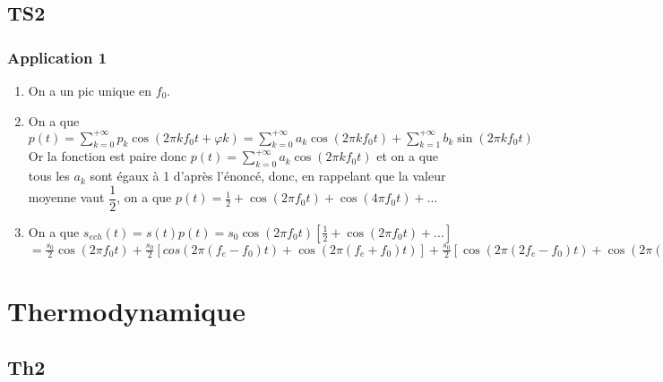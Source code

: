\documentclass[a4paper,12pt]{book}
\begin{document}
\section{TS2}
\subsection{Application 1}
\begin{enumerate}
\item On a un pic unique en $f_0$.
\item On a que $p(t)=\sum\limits_{k=0}^{+\infty}p_k\cos(2\pi kf_0t+\varphi k) = \sum\limits_{k=0}^{+\infty}a_k\cos(2\pi kf_0t) + \sum\limits_{k=1}^{+\infty} b_k\sin(2\pi kf_0t)$ Or la fonction est paire donc $p(t)= \sum\limits_{k=0}^{+\infty}a_k\cos(2\pi kf_0t)$ et on a que tous les $a_k$ sont égaux à 1 d'après l'énoncé, donc, en rappelant que la valeur moyenne vaut $\dfrac{1}{2}$, on a que $p(t)=\frac{1}{2} +\cos(2\pi f_0t) + \cos(4\pi f_0t) +...$
\item On a que $s_{ech}(t) = s(t)p(t) = s_0\cos(2\pi f_0t)\left[\frac{1}{2}+\cos(2\pi f_0t)+...\right]$
\\ $ = \frac{s_0}{2}\cos(2\pi f_0t) + \frac{s_0}{2}[cos(2\pi (f_e-f_0)t)+\cos(2\pi (f_e+f_0)t)] + \frac{s_0}{2}[\cos(2\pi (2f_e-f_0)t)+\cos(2\pi(2f_E+f_0)t)]+...$
\end{enumerate}




















\chapter{Thermodynamique}
\section{Th2}
\end{document}

